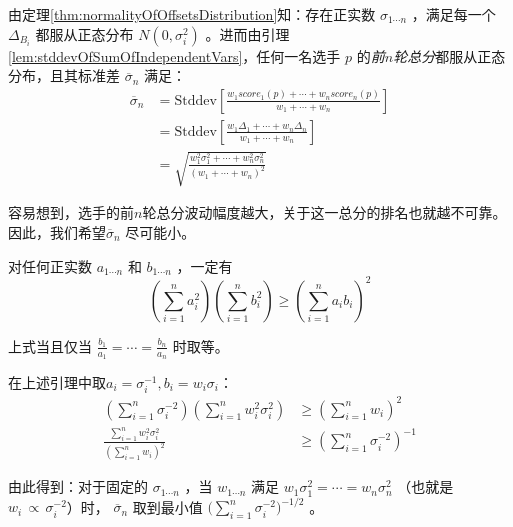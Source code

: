         \vspace{1.5ex}

        由定理\ref{thm:normalityOfOffsetsDistribution}知：存在正实数 $\sigma_{1\cdots n}$ ，满足每一个 $\Delta_{B_i}$ 都服从正态分布 $N(0,\sigma_i^2)$ 。进而由引理\ref{lem:stddevOfSumOfIndependentVars}，任何一名选手 $p$ 的\emph{前$n$轮总分}都服从正态分布，且其标准差 $\overline{\sigma}_n$ 满足：
        \begin{align*}
            \overline{\sigma}_n
            &=\mathrm{Stddev}\left[\frac{w_1\textit{score}_1(p)+\cdots+w_n\textit{score}_n(p)}{w_1+\cdots+w_n}\right] \\
            &=\mathrm{Stddev}\left[\frac{w_1\Delta_1+\cdots+w_n\Delta_n}{w_1+\cdots+w_n}\right] \\
            &=\sqrt{\frac{w_1^2\sigma_1^2+\cdots+w_n^2\sigma_n^2}{\left(w_1+\cdots+w_n\right)^2}}
        \end{align*}

        容易想到，选手的前$n$轮总分波动幅度越大，关于这一总分的排名也就越不可靠。因此，我们希望$\overline{\sigma}_n$ 尽可能小。

        \begin{lemma}[柯西不等式]
            对任何正实数 $a_{1\cdots n}$ 和 $b_{1\cdots n}$ ，一定有
            $$
            \left(\sum\limits_{i=1}^n a_i^2\right)\left(\sum\limits_{i=1}^n b_i^2\right)
            \geq\left(\sum\limits_{i=1}^n a_ib_i\right)^2
            $$

            上式当且仅当 $\frac{b_1}{a_1}=\cdots=\frac{b_n}{a_n}$ 时取等。

            \label{lem:Cauchy}
        \end{lemma}

        在上述引理中取$a_i=\sigma_i^{-1},b_i=w_i\sigma_i$：
        \begin{align*}
            \left(\sum\limits_{i=1}^n \sigma_i^{-2}\right)\left(\sum\limits_{i=1}^n w_i^2\sigma_i^2\right)&\geq\left(\sum\limits_{i=1}^n w_i\right)^2 \\
            \frac{\sum\limits_{i=1}^n w_i^2\sigma_i^2}{\left(\sum\limits_{i=1}^n w_i\right)^2}&\geq\left(\sum\limits_{i=1}^n \sigma_i^{-2}\right)^{-1}
        \end{align*}

        由此得到：对于固定的 $\sigma_{1\cdots n}$ ，当 $w_{1\cdots n}$ 满足 $w_1\sigma_1^2=\cdots=w_n\sigma_n^2$ （也就是$w_i\,\propto\, \sigma_i^{-2}$）时， $\overline{\sigma}_n$ 取到最小值 $\big(\sum_{i=1}^n \sigma_i^{-2}\big)^{-1/2}$ 。
        
